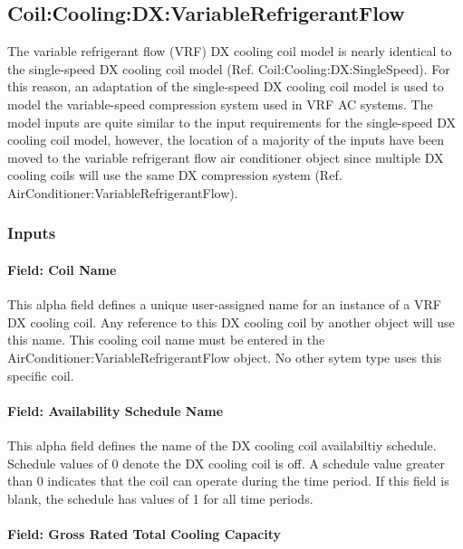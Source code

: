 \subsection{Coil:Cooling:DX:VariableRefrigerantFlow}\label{coilcoolingdxvariablerefrigerantflow}

The variable refrigerant flow (VRF) DX cooling coil model is nearly identical to the single-speed DX cooling coil model (Ref. Coil:Cooling:DX:SingleSpeed). For this reason, an adaptation of the single-speed DX cooling coil model is used to model the variable-speed compression system used in VRF AC systems. The model inputs are quite similar to the input requirements for the single-speed DX cooling coil model, however, the location of a majority of the inputs have been moved to the variable refrigerant flow air conditioner object since multiple DX cooling coils will use the same DX compression system (Ref. AirConditioner:VariableRefrigerantFlow).

\subsubsection{Inputs}\label{inputs-6-010}

\paragraph{Field: Coil Name}\label{field-coil-name-000}

This alpha field defines a unique user-assigned name for an instance of a VRF DX cooling coil. Any reference to this DX cooling coil by another object will use this name. This cooling coil name must be entered in the AirConditioner:VariableRefrigerantFlow object. No other sytem type uses this specific coil.

\paragraph{Field: Availability Schedule Name}\label{field-availability-schedule-name-1-007}

This alpha field defines the name of the DX cooling coil availabiltiy schedule. Schedule values of 0 denote the DX cooling coil is off. A schedule value greater than 0 indicates that the coil can operate during the time period. If this field is blank, the schedule has values of 1 for all time periods.

\paragraph{Field: Gross Rated Total Cooling Capacity}\label{field-gross-rated-total-cooling-capacity}

